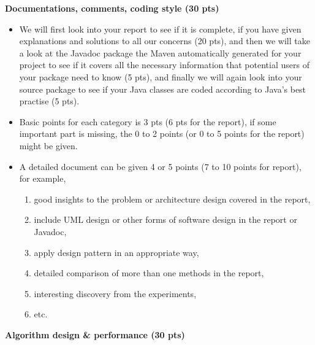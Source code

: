 \textbf{Documentations, comments, coding style (30 pts)}

\begin{itemize}

\item We will first look into your report to see if it is complete, if you have
given explanations and solutions to all our concerns (20 pts), and then we will
take a look at the Javadoc package the Maven automatically generated for your
project to see if it covers all the necessary information that potential users
of your package need to know (5 pts), and finally we will again look into your
source package to see if your Java classes are coded according to Java's best
practise (5 pts).

\item Basic points for each category is 3 pts (6 pts for the report), if some
important part is missing, the 0 to 2 points (or 0 to 5 points for the report)
might be given.

\item A detailed document can be given 4 or 5 points (7 to 10 points for report), for example,

\begin{enumerate}
\item good insights to the problem or architecture design covered in the report,
\item include UML design or other forms of software design in the report or Javadoc,
\item apply design pattern in an appropriate way,
\item detailed comparison of more than one methods in the report,
\item interesting discovery from the experiments,
\item etc.
\end{enumerate}

\end{itemize}

\textbf{Algorithm design \& performance (30 pts)}

